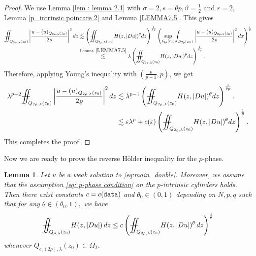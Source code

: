 \documentclass[notitlepage,11pt,reqno]{amsart}
\newtheorem{lemma}[theorem]{Lemma}
\theoremstyle{definition}
\numberwithin{equation}{section}
\newcommand{\la}{\lambda}
\newcommand{\iintss}{{\int\hspace{-0.28cm}\int}}
\newcommand{ \miints }{{\iintss\hspace{-0.56cm} -\hspace{-0.15cm}-}}
\newcommand{\miint}[1]{{\miints_{\hspace{-0.13cm}#1}}}
\def\Xint#1{\mathchoice
	{\XXint\displaystyle\textstyle{#1}}%
	{\XXint\textstyle\scriptstyle{#1}}%
	{\XXint\scriptstyle\scriptscriptstyle{#1}}%
	{\XXint\scriptscriptstyle\scriptscriptstyle{#1}}%
	\!\int}
\def\XXint#1#2#3{{\setbox0=\hbox{$#1{#2#3}{\int}$}
		\vcenter{\hbox{$#2#3$}}\kern-.50\wd0}}
\def\Xint#1{\mathchoice
	{\XXint\displaystyle\textstyle{#1}}%
	{\XXint\textstyle\scriptstyle{#1}}%
	{\XXint\scriptstyle\scriptscriptstyle{#1}}%
	{\XXint\scriptscriptstyle\scriptscriptstyle{#1}}%
	\!\int}
\def\XXint#1#2#3{{\setbox0=\hbox{$#1{#2#3}{\int}$}
		\vcenter{\hbox{$#2#3$}}\kern-.50\wd0}}
\def\dashint{\Xint-}
\begin{document}
\begin{proof}
We use Lemma \ref{lem : lemma 2.1}  with $\sigma =2, s=\theta p, \vartheta=\frac{1}{2}$ and $r=2,$  Lemma \ref{p_intrinsic poincare 2} and Lemma \ref{LEMMA7.5}. This gives
\begin{align*} 
\miint{Q_{2\rho, \lambda}(z_0)}\left|\frac{u-(u)_{Q_{2\rho, \lambda}(z_0)}}{2\varrho}\right|^2 dz &\lesssim \left(\miint{Q_{2\rho, \lambda}(z_0)}H(z, |D u|)^{\theta}dz\right) ^{\frac{1}{\theta p}}\left(\sup_{I_{2\rho}(t_0)}\dashint_{B_{2\rho}(x_0)}\left|\frac{u-(u)_{Q_{2\rho, \lambda}(z_0)}}{2\varrho}\right|^2 dx\right)^{\frac{1}{2}}\\
&\overset{\text{Lemma}~\ref{LEMMA7.5}}{\lesssim} \lambda \left(\miint{Q_{2\varrho, \lambda}(z_0)} H(z, |D u|)^{\theta}dz\right)^{\frac{1}{\theta p}}.
\end{align*}
Therefore, applying Young's inequality with $(\frac{p}{p-1}, p)$, we get
\begin{align*}
  \lambda^{p-2} \miint{Q_{2\rho, \lambda}(z_0)}\left|\frac{u-(u)_{Q_{2\rho, \lambda}(z_0)}}{2\varrho}\right|^2 dz &\lesssim\lambda^{p-1}\left(\miint{Q_{2\rho, \lambda}(z_0)}H(z,  |D u|)^{\theta}dz\right)^{\frac{1}{\theta p}}.\\
  &\lesssim \varepsilon \lambda^p + c(\varepsilon) \left(\miint{Q_{2\varrho, \lambda}(z_0)} H(z, |Du|)^{\theta}dz\right)^{\frac{1}{\theta}}.
\end{align*}
This completes the proof.
\end{proof}
Now we are ready to prove the reverse H\"{o}lder inequality for the $p$-phase.
\begin{lemma}\label{LEM5.4}
Let $u$ be a weak solution to \eqref{eq:main_double}. Moreover, we assume that the assumption \eqref{eq: p-phase condition} on the $p$-intrinsic cylinders holds. Then there exist constants $c=c(\textnormal{\texttt{data}})$ and $\theta_0 \in (0,1)$ depending on $N,p,q$ such that for any $\theta \in (\theta_0, 1),$  we have
\begin{align*}
\miint{Q_{\rho, \lambda}(z_0)}H(z, |D u|)\, dz \leq c \left(\miint{Q_{2\rho, \lambda}(z_0)}H(z, |D u|)^{\theta}\,dz\right)^{\frac{1}{\theta}}
\end{align*}
whenever $Q_{c_v(2\rho), \la}(z_0)\subset \Omega_T.$
\end{lemma}
\end{document}
